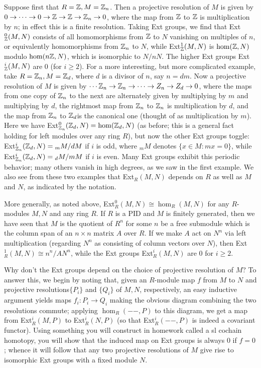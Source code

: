 \documentclass[10pt]{article}
\begin{document}
Suppose first that $R = \Bbb Z, M = \Bbb Z_n$. Then a projective
resolution of $M$ is given by $0\rightarrow\cdots\rightarrow
0\rightarrow\Bbb Z\rightarrow\Bbb Z\rightarrow\Bbb Z_n\rightarrow 0$,
where the map from $\Bbb Z$ to $\Bbb Z$ is multiplication by $n$; in
effect this is a finite resolution. Taking Ext groups, we find that
Ext$_{\Bbb Z}^0(M,N)$ consists of all homomorphisms from $\Bbb Z$ to $N$
vanishing on multiples of $n$, or equivalently homomorphisms from $\Bbb
Z_n$ to $N$, while Ext$_{\Bbb Z}^1(M,N)$ is $\hom(\Bbb Z,N)$ modulo
$\hom(n\Bbb Z,N)$, which is isomorphic to $N/nN$. The higher Ext groups
Ext$_{\Bbb Z}^i(M,N)$ are 0 (for $i\ge2$). For a more interesting, but
more complicated example, take $R = \Bbb Z_n, M = \Bbb Z_d$, where $d$
is a divisor of $n$, say $n=dm$. Now a projective resolution of $M$ is
given by $\cdots\Bbb Z_n\rightarrow\Bbb Z_n\rightarrow\cdots\rightarrow
Z_n\rightarrow Z_d\rightarrow 0$, where the maps from one copy of $\Bbb
Z_n$ to the next are alternately given by multiplying by $m$ and
multiplying by $d$, the rightmost map from $\Bbb Z_n$ to $\Bbb Z_n$ is
multiplication by $d$, and the map from $\Bbb Z_n$ to $\Bbb Z_d$is the
canonical one (thought of as multiplication by $m$). Here we have
Ext$_{\Bbb Z_n}^0(\Bbb Z_d,N) = \hom(\Bbb Z_d,N)$ (as before; this is a
general fact holding for left modules over any ring $R$), but now the
other Ext groups toggle: Ext$_{\Bbb Z_n}^i(\Bbb Z_d,N) = {}_m M/dM$ if
$i$ is odd, where ${}_m M$ denotes $\{x\in M: mx = 0\}$, while
Ext$_{\Bbb Z_n}^i(\Bbb Z_d,N) = {}_d M/mM$ if $i$ is even. Many Ext
groups exhibit this periodic behavior; many others vanish in high
degrees, as we saw in the first example. We also see from these two
examples that Ext$_R(M,N)$ depends on $R$ as well as $M$ and $N$, as
indicated by the notation.

More generally, as noted above, Ext$_R^0(M,N)\cong\hom_R(M,N)$ for any
$R$-modules $M,N$ and any ring $R$. If $R$ is a PID and $M$ is finitely
generated, then we have seen that $M$ is the quotient of $R^n$ for some
$n$ be a free submodule which is the column span of an $n\times n$
matrix $A$ over $R$. If we make $A$ act on $N^n$ via left multiplication
(regarding $N^n$ as consisting of column vectors over $N$), then
Ext$_R^1(M,N)\cong n^n/AN^n$, while the Ext groups Ext$_R^i(M,N)$ are 0
for $i\ge2$.

Why don't the Ext groups depend on the choice of projective resolution
of $M$? To answer this, we begin by noting that, given an $R$-module map
$f$ from $M$ to $N$ and projective resolutions$\{P_i\}$ and $\{Q_i\}$ of
$M,N$, respectively, an easy inductive argument yields maps
$f_i:P_i\rightarrow Q_i$ making the obvious diagram combining the two
resolutions commute; applying $\hom_R(--,P)$ to this diagram, we get a
map from Ext$_R^i(M,P)$ to Ext$_R^i(N,P)$ (so that Ext$_R^i(--,P)$ is
indeed a covariant functor). Using something you will construct in
homework called a {sl cochain homotopy}, you will show that the induced
map on Ext groups is always 0 if $f=0$; whence it will follow that any
two projective resolutions of $M$ give rise to isomorphic Ext groups
with a fixed module $N$.
\end{document}
